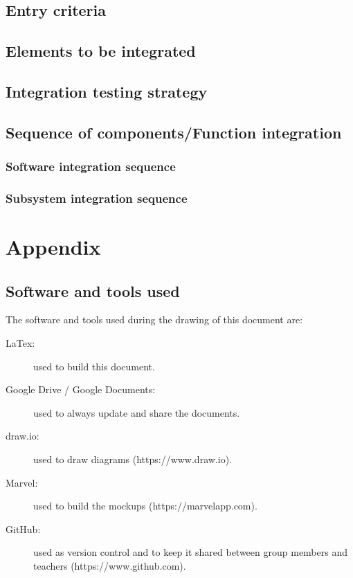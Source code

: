 \documentclass{article}
\begin{document}
	\subsection{Entry criteria}


	\subsection{Elements to be integrated}


	\subsection{Integration testing strategy}


	\subsection{Sequence of components/Function integration}


	\subsubsection{Software integration sequence}


	\subsubsection{Subsystem integration sequence}


	\newpage
	\appendix
	\section{Appendix}


	\subsection{Software and tools used}

	The software and tools used during the drawing of this document are:

	\begin{description}
	\item [LaTex:] used to build this document.
	\item [Google Drive / Google Documents:] used to always update and share the documents.
	\item [draw.io:] used to draw diagrams (https://www.draw.io).
	\item [Marvel:] used to build the mockups (https://marvelapp.com).
	\item [GitHub:] used as version control and to keep it shared between group members and teachers (https://www.github.com).
	\end{description}
	
\end{document}
